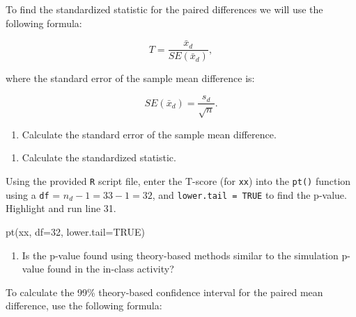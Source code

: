 \documentclass[
]{report}
\newenvironment{Shaded}{\begin{snugshade}}{\end{snugshade}}
\newcommand{\AttributeTok}[1]{\textcolor[rgb]{0.77,0.63,0.00}{#1}}
\newcommand{\ConstantTok}[1]{\textcolor[rgb]{0.00,0.00,0.00}{#1}}
\newcommand{\DecValTok}[1]{\textcolor[rgb]{0.00,0.00,0.81}{#1}}
\newcommand{\FunctionTok}[1]{\textcolor[rgb]{0.00,0.00,0.00}{#1}}
\newcommand{\NormalTok}[1]{#1}
\providecommand{\tightlist}{%
  \setlength{\itemsep}{0pt}\setlength{\parskip}{0pt}}
\begin{document}
\vspace{1in}

To find the standardized statistic for the paired differences we will use the following formula:

\[T = \frac{\bar{x}_d}{SE(\bar{x}_d)},\]

where the standard error of the sample mean difference is:

\[SE(\bar{x}_d)=\frac{s_d}{\sqrt{n}}.\]

\begin{enumerate}
\def\labelenumi{\arabic{enumi}.}
\setcounter{enumi}{1}
\tightlist
\item
  Calculate the standard error of the sample mean difference.
\end{enumerate}

\vspace{0.5in}

\begin{enumerate}
\def\labelenumi{\arabic{enumi}.}
\setcounter{enumi}{2}
\tightlist
\item
  Calculate the standardized statistic.
\end{enumerate}

\vspace{0.5in}

Using the provided \texttt{R} script file, enter the T-score (for \texttt{xx}) into the \texttt{pt()} function using a \texttt{df} = \(n_d-1 = 33 - 1 = 32\), and \texttt{lower.tail\ =\ TRUE} to find the p-value. Highlight and run line 31.

\begin{Shaded}
\begin{Highlighting}[]
\FunctionTok{pt}\NormalTok{(xx, }\AttributeTok{df=}\DecValTok{32}\NormalTok{, }\AttributeTok{lower.tail=}\ConstantTok{TRUE}\NormalTok{)}
\end{Highlighting}
\end{Shaded}

\begin{enumerate}
\def\labelenumi{\arabic{enumi}.}
\setcounter{enumi}{3}
\tightlist
\item
  Is the p-value found using theory-based methods similar to the simulation p-value found in the in-class activity?
\end{enumerate}

\vspace{0.5in}

To calculate the 99\% theory-based confidence interval for the paired mean difference, use the following formula:
\end{document}

